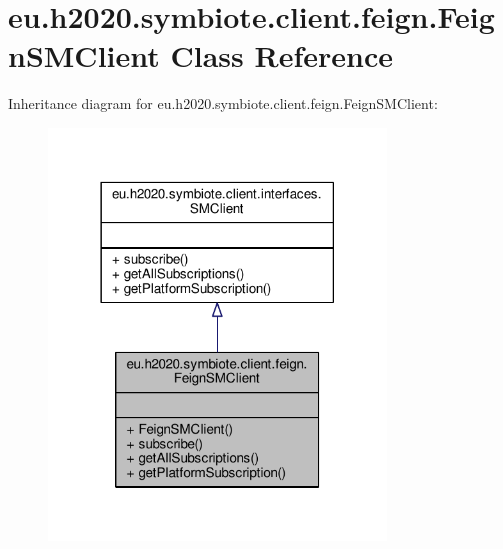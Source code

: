 \hypertarget{classeu_1_1h2020_1_1symbiote_1_1client_1_1feign_1_1FeignSMClient}{}\section{eu.\+h2020.\+symbiote.\+client.\+feign.\+Feign\+S\+M\+Client Class Reference}
\label{classeu_1_1h2020_1_1symbiote_1_1client_1_1feign_1_1FeignSMClient}


Inheritance diagram for eu.\+h2020.\+symbiote.\+client.\+feign.\+Feign\+S\+M\+Client\+:
\nopagebreak
\begin{figure}[H]
\begin{center}
\leavevmode
\includegraphics[width=254pt]{classeu_1_1h2020_1_1symbiote_1_1client_1_1feign_1_1FeignSMClient__inherit__graph}
\end{center}
\end{figure}


